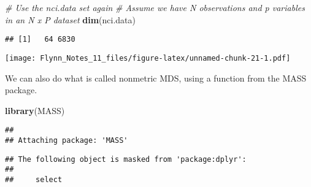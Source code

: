 \documentclass[]{article}
\newenvironment{Shaded}{\begin{snugshade}}{\end{snugshade}}
\newcommand{\KeywordTok}[1]{\textcolor[rgb]{0.13,0.29,0.53}{\textbf{#1}}}
\newcommand{\DataTypeTok}[1]{\textcolor[rgb]{0.13,0.29,0.53}{#1}}
\newcommand{\DecValTok}[1]{\textcolor[rgb]{0.00,0.00,0.81}{#1}}
\newcommand{\FloatTok}[1]{\textcolor[rgb]{0.00,0.00,0.81}{#1}}
\newcommand{\StringTok}[1]{\textcolor[rgb]{0.31,0.60,0.02}{#1}}
\newcommand{\CommentTok}[1]{\textcolor[rgb]{0.56,0.35,0.01}{\textit{#1}}}
\newcommand{\OtherTok}[1]{\textcolor[rgb]{0.56,0.35,0.01}{#1}}
\newcommand{\OperatorTok}[1]{\textcolor[rgb]{0.81,0.36,0.00}{\textbf{#1}}}
\newcommand{\NormalTok}[1]{#1}
\begin{document}
\begin{Shaded}
\begin{Highlighting}[]
\CommentTok{# Use the nci.data set again}
\CommentTok{# Assume we have N observations and p variables in an N x P dataset}
\KeywordTok{dim}\NormalTok{(nci.data)}
\end{Highlighting}
\end{Shaded}

\begin{verbatim}
## [1]   64 6830
\end{verbatim}

\begin{Shaded}
\end{Shaded}

\texttt{[image: Flynn\_Notes\_11\_files/figure-latex/unnamed-chunk-21-1.pdf]}

We can also do what is called nonmetric MDS, using a function from the
MASS package.

\begin{Shaded}
\begin{Highlighting}[]
\KeywordTok{library}\NormalTok{(MASS)}
\end{Highlighting}
\end{Shaded}

\begin{verbatim}
## 
## Attaching package: 'MASS'
\end{verbatim}

\begin{verbatim}
## The following object is masked from 'package:dplyr':
## 
##     select
\end{verbatim}
\end{document}
